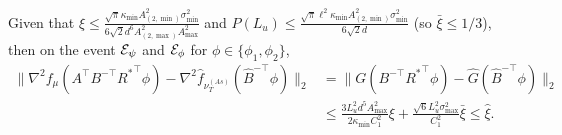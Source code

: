 \begin{lemma}
\label{lem:Binversenablavariation1}
Given that $\xi \le \frac{\sqrt{\pi}\kappa_{\min}A^2_{(2,\min)}\sigma_{\min}^2}{6\sqrt{2}d^6A_{(2,\max)}^2A_{\max}^2}$ and $P(L_u) \le \frac{\sqrt{\pi}\ell^2\kappa_{\min}A^2_{(2,\min)}\sigma_{\min}^2}{6\sqrt{2}d}$
(so $\bar{\xi} \le 1/3$), then on the event $\mathcal{E}_{\psi}$ and $\mathcal{E}_{\phi}$ for $\phi \in \{\phi_1, \phi_2\}$,
\begin{align*}
\|\nabla^2 f_{\mu}(A^{\top}B^{-\top}{R^*}^{\top}\phi) - \nabla^2 \hat{f}_{\nu_T^{(As)}}(\hat{B}^{-\top}\phi)  \|_2 
 & = \|G(B^{-\top}{R^*}^{\top}\phi) - \hat{G}(\hat{B}^{-\top}\phi)\|_2\\
& \le 
\frac{3L_u^2d^5A^2_{\max}}{2\kappa_{\min}C_1^2}\xi + \frac{\sqrt{6}L_u^2\sigma_{\max}^2}{C_1^2}\bar{\xi}
\le \hat{\xi}.
\end{align*}
\end{lemma}
